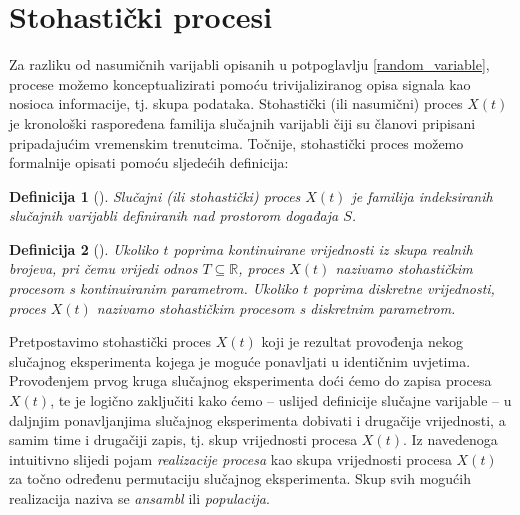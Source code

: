 \documentclass[a4paper,12pt,oneside]{memoir}
\newtheorem{definition}{Definicija}[chapter]
\begin{document}
 
        \section{Stohastički procesi} \label{stoh_proc}



            Za razliku od nasumičnih varijabli opisanih u potpoglavlju \ref{random_variable}, procese možemo konceptualizirati pomoću trivijaliziranog opisa signala kao nosioca informacije, tj. skupa podataka. Stohastički (ili nasumični) proces $X(t)$ je kronološki raspoređena familija slučajnih varijabli čiji su članovi pripisani pripadajućim vremenskim trenutcima. Točnije, stohastički proces možemo formalnije opisati pomoću sljedećih definicija:

            \begin{definition}[\cite{Bahovec}]
                Slučajni (ili stohastički) proces ${X(t)}$ je familija indeksiranih slučajnih varijabli definiranih nad prostorom događaja $S$.
            \end{definition}

            \begin{definition}[\cite{Priestley}]
                Ukoliko $t$ poprima kontinuirane vrijednosti iz skupa realnih brojeva, pri čemu vrijedi odnos $T\subseteq \mathbb{R}$, proces ${X(t)}$ nazivamo stohastičkim procesom s kontinuiranim parametrom. Ukoliko $t$ poprima diskretne vrijednosti, proces ${X(t)}$ nazivamo stohastičkim procesom s diskretnim parametrom.
            \end{definition}

            Pretpostavimo stohastički proces ${X(t)}$ koji je rezultat provođenja nekog slučajnog eksperimenta kojega je moguće ponavljati u identičnim uvjetima. Provođenjem prvog kruga slučajnog eksperimenta doći ćemo do zapisa procesa ${X(t)}$, te je logično zaključiti kako ćemo -- uslijed definicije slučajne varijable -- u daljnjim ponavljanjima slučajnog eksperimenta dobivati i drugačije vrijednosti, a samim time i drugačiji zapis, tj. skup vrijednosti procesa ${X(t)}$. Iz navedenoga intuitivno slijedi pojam \textit{realizacije procesa} kao skupa vrijednosti procesa ${X(t)}$ za točno određenu permutaciju slučajnog eksperimenta. Skup svih mogućih realizacija naziva se \textit{ansambl} ili \textit{populacija}.
\end{document}
